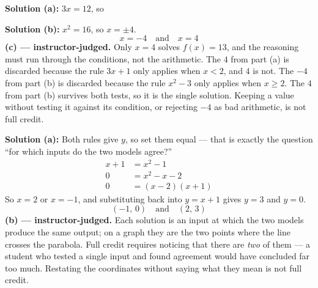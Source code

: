 \documentclass[12pt]{article}
\begin{document}

\textbf{Solution (a):} $3x = 12$, so 

\textbf{Solution (b):} $x^2 = 16$, so $x = \pm 4$.
\[ \boxed{x = -4 \quad \text{and} \quad x = 4} \]
\textbf{(c) --- instructor-judged.} Only $x = 4$ solves $f(x) = 13$, and the reasoning must run through the conditions, not the arithmetic. The $4$ from part (a) is discarded because the rule $3x+1$ only applies when $x < 2$, and $4$ is not. The $-4$ from part (b) is discarded because the rule $x^2 - 3$ only applies when $x \ge 2$. The $4$ from part (b) survives both tests, so it is the single solution. Keeping a value without testing it against its condition, or rejecting $-4$ as bad arithmetic, is not full credit.


\textbf{Solution (a):} Both rules give $y$, so set them equal --- that is exactly the question ``for which inputs do the two models agree?''
\begin{align*}
  x + 1 &= x^2 - 1 \\
  0 &= x^2 - x - 2 \\
  0 &= (x-2)(x+1)
\end{align*}
So $x = 2$ or $x = -1$, and substituting back into $y = x+1$ gives $y = 3$ and $y = 0$.
\[ \boxed{(-1,\, 0) \quad \text{and} \quad (2,\, 3)} \]
\textbf{(b) --- instructor-judged.} Each solution is an input at which the two models produce the same output; on a graph they are the two points where the line crosses the parabola. Full credit requires noticing that there are \emph{two} of them --- a student who tested a single input and found agreement would have concluded far too much. Restating the coordinates without saying what they mean is not full credit.
\end{document}
